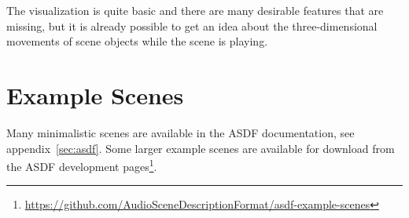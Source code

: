 The visualization is quite basic and there are many desirable features that are
missing, but it is already possible to get an idea about the three-dimensional
movements of scene objects while the scene is playing.


\section{Example Scenes}

Many minimalistic scenes are available in the ASDF documentation,
see appendix~\ref{sec:asdf}.
Some larger example scenes are available for download from the ASDF development
pages\footnote{%
\url{https://github.com/AudioSceneDescriptionFormat/asdf-example-scenes}}.
